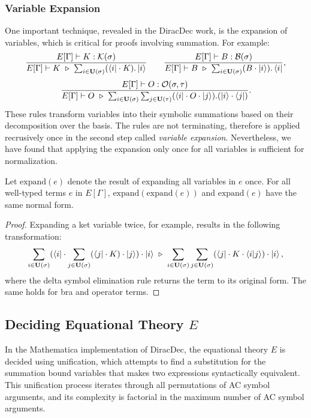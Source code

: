 \documentclass[runningheads]{llncs}
\begin{document}
\subsubsection{Variable Expansion}
One important technique, revealed in the DiracDec work, is the expansion of variables, which is critical for proofs involving summation. For example:
\[
\frac{E[\Gamma] \vdash K : \KType(\sigma)}{E[\Gamma] \vdash K \ \reduce\ \sum_{i \in \mathbf{U}(\sigma)}(\bra{i} \cdot K).\ket{i}} \quad \quad
\frac{E[\Gamma] \vdash B : \BType(\sigma)}{E[\Gamma] \vdash B \ \reduce\ \sum_{i \in \mathbf{U}(\sigma)}(B \cdot \ket{i}).\bra{i}},
\]
\[
\frac{E[\Gamma] \vdash O : \mathcal{O}(\sigma, \tau)}{E[\Gamma] \vdash O \ \triangleright\ \sum_{i \in \mathbf{U}(\sigma)} \sum_{j \in \mathbf{U}(\tau)}(\bra{i} \cdot O \cdot \ket{j}).(\ket{i} \cdot \bra{j})}.
\]
These rules transform variables into their symbolic summations based on their decomposition over the basis. 
The rules are not terminating, therefore is applied recrusively once in the second step called \textit{variable expansion}.
Nevertheless, we have found that applying the expansion only once for all variables is sufficient for normalization.
\begin{lemma}
    Let \( \textrm{expand}(e) \) denote the result of expanding all variables in \( e \) once. For all well-typed terms \( e \) in \( E[\Gamma] \), \( \textrm{expand}(\textrm{expand}(e)) \) and \( \textrm{expand}(e) \) have the same normal form.
\end{lemma}
\begin{proof}
    Expanding a ket variable twice, for example, results in the following transformation:
    \[
    \sum_{i \in \mathbf{U}(\sigma)} (\bra{i} \cdot \sum_{j \in \mathbf{U}(\sigma)} (\bra{j} \cdot K) \cdot \ket{j}) \cdot \ket{i} \ \triangleright\  \sum_{i \in \mathbf{U}(\sigma)} \sum_{j \in \mathbf{U}(\sigma)} (\bra{j} \cdot K \cdot \braket{i|j}) \cdot \ket{i},
    \]
    where the delta symbol elimination rule returns the term to its original form. The same holds for bra and operator terms.
\end{proof}



\subsection{Deciding Equational Theory \( E \)}

In the Mathematica implementation of DiracDec, the equational theory \( E \) is decided using unification, which attempts to find a substitution for the summation bound variables that makes two expressions syntactically equivalent. This unification process iterates through all permutations of AC symbol arguments, and its complexity is factorial in the maximum number of AC symbol arguments.
\end{document}
